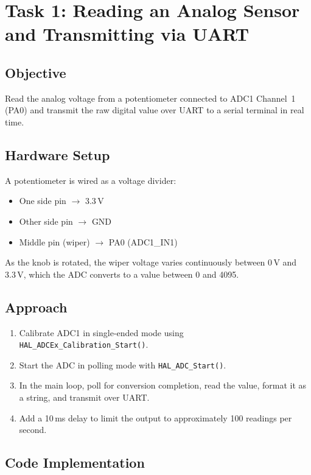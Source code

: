 \documentclass[12pt,a4paper]{article}
\begin{document}
\section{Task 1: Reading an Analog Sensor and Transmitting via UART}

\subsection{Objective}
Read the analog voltage from a potentiometer connected to ADC1 Channel~1 (PA0) and transmit the raw digital value over UART to a serial terminal in real time.

\subsection{Hardware Setup}
A potentiometer is wired as a voltage divider:
\begin{itemize}
    \item One side pin $\rightarrow$ 3.3\,V
    \item Other side pin $\rightarrow$ GND
    \item Middle pin (wiper) $\rightarrow$ PA0 (ADC1\_IN1)
\end{itemize}

As the knob is rotated, the wiper voltage varies continuously between 0\,V and 3.3\,V, which the ADC converts to a value between 0 and 4095.

\subsection{Approach}
\begin{enumerate}
    \item Calibrate ADC1 in single-ended mode using \texttt{HAL\_ADCEx\_Calibration\_Start()}.
    \item Start the ADC in polling mode with \texttt{HAL\_ADC\_Start()}.
    \item In the main loop, poll for conversion completion, read the value, format it as a string, and transmit over UART.
    \item Add a 10\,ms delay to limit the output to approximately 100 readings per second.
\end{enumerate}

\subsection{Code Implementation}
\end{document}
